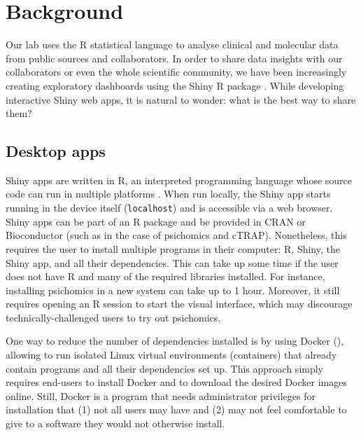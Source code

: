 \section{Background}

Our lab uses the R statistical language to analyse clinical and molecular data from public sources and collaborators. In order to share data insights with our collaborators or even the whole scientific community, we have been increasingly creating exploratory dashboards using the Shiny R package \cite{chang:2021ul}. While developing interactive Shiny web apps, it is natural to wonder: what is the best way to share them?

\subsection{Desktop apps}

Shiny apps are written in R, an interpreted programming language whose source code can run in multiple platforms \cite{r-core-team:2021wf,chang:2021ul}. When run locally, the Shiny app starts running in the device itself (\texttt{localhost}) and is accessible via a web browser. Shiny apps can be part of an R package and be provided in CRAN or Bioconductor (such as in the case of psichomics and cTRAP). Nonetheless, this requires the user to install multiple programs in their computer: R, Shiny, the Shiny app, and all their dependencies. This can take up some time if the user does not have R and many of the required libraries installed. For instance, installing psichomics in a new system can take up to 1 hour. Moreover, it still requires opening an R session to start the visual interface, which may discourage technically-challenged users to try out psichomics.


One way to reduce the number of dependencies installed is by using Docker (), allowing to run isolated Linux virtual environments (containers) that already contain programs and all their dependencies set up. This approach simply requires end-users to install Docker and to download the desired Docker images online. Still, Docker is a program that needs administrator privileges for installation that (1) not all users may have and (2) may not feel comfortable to give to a software they would not otherwise install.

